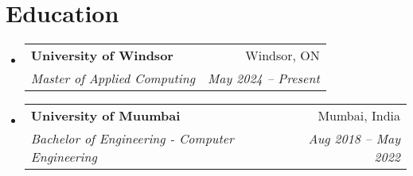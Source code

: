 \documentclass[letterpaper,11pt]{article}
\makeatletter
\newcommand{\resumeSubheading}[4]{
  \vspace{-2pt}\item
    \begin{tabular*}{0.97\textwidth}[t]{l@{\extracolsep{\fill}}r}
      \textbf{#1} & #2 \\
      \textit{\small#3} & \textit{\small #4} \\
    \end{tabular*}\vspace{-7pt}
}
\newcommand{\resumeSubHeadingListStart}{\begin{itemize}[leftmargin=0.15in, label={}]}
\newcommand{\resumeSubHeadingListEnd}{\end{itemize}}
\makeatother
\begin{document}
%

\section{Education}
  \resumeSubHeadingListStart
    \resumeSubheading
      {University of Windsor}{Windsor, ON}
      {Master of Applied Computing}{May 2024 -- Present}
    \resumeSubheading
      {University of Muumbai}{Mumbai, India}
      {Bachelor of Engineering - Computer Engineering}{Aug 2018 -- May 2022}
  \resumeSubHeadingListEnd

\end{document}
